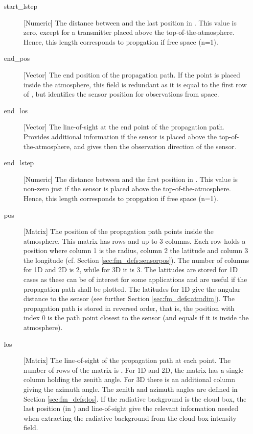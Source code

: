 \begin{description}
   \item[start\_lstep] [Numeric] The distance between 
     and the last position in . This value is zero, except for a
     transmitter placed above the top-of-the-atmosphere. Hence, this length
     corresponds to propgation if free space (n=1).

   \item[end\_pos] [Vector] The end position of the propagation path. If
     the point is placed inside the atmosphere, this field is redundant as it
     is equal to the first row of , but identifies the sensor
     position for observations from space.

   \item[end\_los] [Vector] The line-of-sight at the end point of the
     propagation path. Provides additional information if the sensor is placed
     above the top-of-the-atmosphere, and gives then the observation direction
     of the sensor.

   \item[end\_lstep] [Numeric] The distance between 
     and the first position in . This value is non-zero just if
     the sensor is placed above the top-of-the-atmosphere. Hence, this length
     corresponds to propgation if free space (n=1).

   \item[pos] [Matrix] The position of the propagation path points inside the
     atmosphere. This matrix has  rows and up to 3 columns. Each
     row holds a position where column 1 is the radius, column 2 the latitude
     and column 3 the longitude (cf. Section \ref{sec:fm_defs:sensorpos}). The
     number of columns for 1D and 2D is 2, while for 3D it is 3. The latitudes
     are stored for 1D cases as these can be of interest for some applications
     and are useful if the propagation path shall be plotted. The latitudes for
     1D give the angular distance to the sensor (see further Section
     \ref{sec:fm_defs:atmdim}). The propagation path is stored in reversed
     order, that is, the position with index 0 is the path point closest to the
     sensor (and equals  if it is inside the atmosphere).
     
   \item[los] [Matrix] The line-of-sight of the propagation path at
     each point. The number of rows of the matrix is .
     For 1D and 2D, the matrix has a single column holding the zenith
     angle. For 3D there is an additional column giving the azimuth
     angle. The zenith and azimuth angles are defined in
     Section \ref{sec:fm_defs:los}. If the radiative background is the
     cloud box, the last position (in ) and
     line-of-sight give the relevant information needed when
     extracting the radiative background from the cloud box intensity
     field.
     

\end{description}
